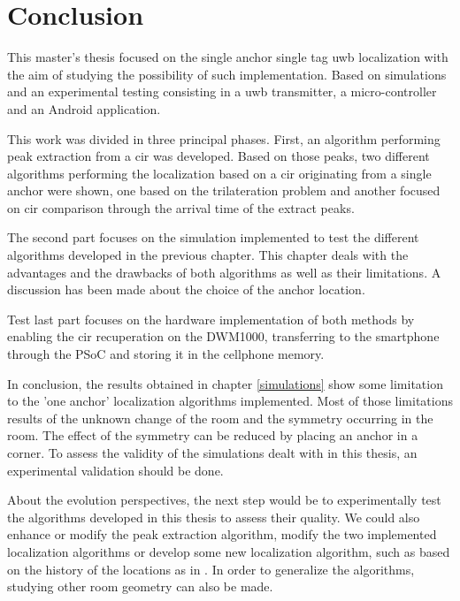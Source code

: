 \chapter{Conclusion}

This master's thesis focused on the single anchor single tag \gls{uwb} localization with the aim of studying the possibility of such implementation. Based on simulations and an experimental testing consisting in a \gls{uwb} transmitter, a micro-controller and an Android application.
\vspace{2mm}

This work was divided in three principal phases. First, an algorithm performing peak extraction from a \gls{cir} was developed. Based on those peaks, two different algorithms performing the localization based on a \gls{cir} originating from a single anchor were shown, one based on the trilateration problem and another focused on \gls{cir} comparison through the arrival time of the extract peaks.
\vspace{2mm}

The second part focuses on the simulation implemented to test the different algorithms developed in the previous chapter. This chapter deals with the advantages and the drawbacks of both algorithms as well as their limitations. A discussion has been made about the choice of the anchor location.
\vspace{2mm}

Test last part focuses on the hardware implementation of both methods by enabling the \gls{cir} recuperation on the DWM1000, transferring to the smartphone through the PSoC and storing it in the cellphone memory. 
\vspace{2mm}

In conclusion, the results obtained in chapter \ref{simulations} show some limitation to the 'one anchor' localization algorithms implemented. Most of those limitations results of the unknown change of the room and the symmetry occurring in the room. The effect of the symmetry can be reduced by placing an anchor in a corner. To assess the validity of the simulations dealt with in this thesis, an experimental validation should be done. 
\vspace{2mm}

About the evolution perspectives, the next step would be to experimentally test the algorithms developed in this thesis to assess their quality. We could also enhance or modify the peak extraction algorithm, modify the two implemented localization algorithms or develop some new localization algorithm, such as based on the history of the locations as in \cite{meissner2010uwb}. In order to generalize the algorithms, studying other room geometry can also be made.